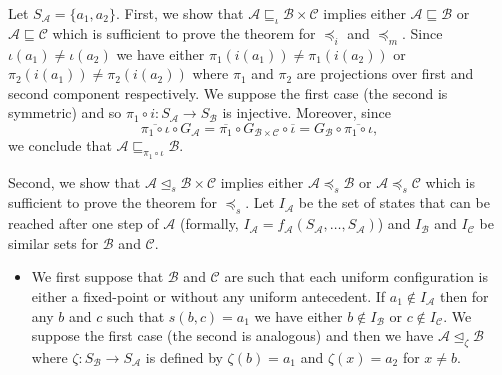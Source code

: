 \documentclass[a4paper]{elsarticle}
\newcommand{\ACA}{\mathcal{A}}
\newcommand{\ACB}{\mathcal{B}}
\newcommand{\ACC}{\mathcal{C}}
\newcommand{\locA}{f_{\ACA}}
\newcommand{\globA}{G_{\ACA}}
\newcommand{\globB}{G_{\ACB}}
\newcommand\alphabe[1]{S_{#1}}
\newcommand{\alphA}{\alphabe{\ACA}}
\newcommand{\alphB}{\alphabe{\ACB}}
\newcommand{\unif}{\overline}
\newcommand\sac{\sqsubseteq}
\newcommand{\fac}{\trianglelefteq}
\newcommand{\simu}{\preccurlyeq}
\newcommand{\sacsimu}{\simu_i}
\newcommand{\facsimu}{\simu_s}
\newcommand{\facsacsimu}{\simu_m}
\begin{document}
\begin{pf}
  Let ${\alphA=\{a_1,a_2\}}$.  First, we show that
  ${\ACA\sac_\iota\ACB\times\ACC}$ implies either ${\ACA\sac\ACB}$ or
  ${\ACA\sac\ACC}$ which is sufficient to prove the theorem for
  $\sacsimu$ and $\facsacsimu$. Since ${\iota(a_1)\not=\iota(a_2)}$ we have
  either ${\pi_1(i(a_1))\not=\pi_1(i(a_2))}$ or
  ${\pi_2(i(a_1))\not=\pi_2(i(a_2))}$ where $\pi_1$ and $\pi_2$ are
  projections over first and second component respectively. We suppose
  the first case (the second is symmetric) and so ${\pi_1\circ i :
    \alphA\rightarrow\alphB}$ is injective. Moreover, since
  \[\unif{\pi_1\circ \iota}\circ\globA = \unif{\pi_1}\circ
  G_{\ACB\times\ACC}\circ\unif{\iota} = \globB\circ\unif{\pi_1\circ
    \iota},\] we conclude that ${\ACA\sac_{\pi_1\circ \iota}\ACB}$.
  

  Second, we show that ${\ACA\fac_s\ACB\times\ACC}$ implies either
  ${\ACA\facsimu\ACB}$ or ${\ACA\facsimu\ACC}$ which is sufficient to
  prove the theorem for $\facsimu$.  Let $I_\ACA$ be the set of states
  that can be reached after one step of $\ACA$ (formally,
  ${I_\ACA=\locA(\alphA,\ldots,\alphA)}$) and $I_\ACB$ and $I_\ACC$ be
  similar sets for $\ACB$ and $\ACC$.

  \begin{itemize}
  \item We first suppose that $\ACB$ and $\ACC$ are such that each
    uniform configuration is either a fixed-point or without any
    uniform antecedent. If ${a_1\not\in I_\ACA}$ then for any $b$ and
    $c$ such that ${s(b,c)=a_1}$ we have either ${b\not\in I_\ACB}$ or
    ${c\not\in I_\ACC}$. We suppose the first case (the second is
    analogous) and then we have ${\ACA\fac_\zeta\ACB}$ where
    ${\zeta:\alphB\rightarrow\alphA}$ is defined by ${\zeta(b) = a_1}$
    and ${\zeta(x)=a_2}$ for ${x\not=b}$.
    

\end{itemize}
\end{pf}
\end{document}
